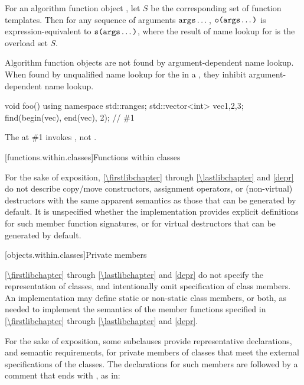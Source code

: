 \pnum
For an algorithm function object ,
let $S$ be the corresponding set of function templates.
Then for any sequence of arguments $\tcode{args} \dotsc$,
$\tcode{o(args} \dotsc \tcode{)}$ is expression-equivalent to
$\tcode{s(args} \dotsc \tcode{)}$,
where the result of name lookup for  is the overload set $S$.
\begin{note}
Algorithm function objects are not found by
argument-dependent name lookup.
When found by unqualified name lookup
for the  in a ,
they inhibit argument-dependent name lookup.
\begin{example}
\begin{codeblock}
void foo() {
  using namespace std::ranges;
  std::vector<int> vec{1,2,3};
  find(begin(vec), end(vec), 2);        // \#1
}
\end{codeblock}
The  at \#1 invokes ,
not .
\end{example}
\end{note}

[functions.within.classes]{Functions within classes}

\pnum
For the sake of exposition, \ref{\firstlibchapter} through \ref{\lastlibchapter}
and \ref{depr} do not describe copy/move constructors, assignment
operators, or (non-virtual) destructors with the same apparent
semantics as those that can be generated
by default.
%
%
%
It is unspecified whether
the implementation provides explicit definitions for such member function
signatures, or for virtual destructors that can be generated by default.

[objects.within.classes]{Private members}

\pnum
\ref{\firstlibchapter} through \ref{\lastlibchapter} and
\ref{depr} do not specify the representation of classes, and intentionally
omit specification of class members. An implementation may
define static or non-static class members, or both, as needed to implement the
semantics of the member functions specified in \ref{\firstlibchapter}
through \ref{\lastlibchapter} and \ref{depr}.

\pnum
For the sake of exposition,
some subclauses provide representative declarations, and semantic requirements, for
private members of classes that meet the external specifications of the classes.
The declarations for such members are
followed by a comment that ends with \expos, as in:

